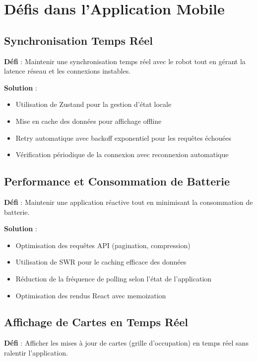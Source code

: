 \documentclass[12pt,a4paper,oneside]{report}
\begin{document}
\section{Défis dans l'Application Mobile}

\subsection{Synchronisation Temps Réel}

\textbf{Défi} : Maintenir une synchronisation temps réel avec le robot tout en gérant la latence réseau et les connexions instables.

\textbf{Solution} :
\begin{itemize}
  \item Utilisation de Zustand pour la gestion d'état locale
  \item Mise en cache des données pour affichage offline
  \item Retry automatique avec backoff exponentiel pour les requêtes échouées
  \item Vérification périodique de la connexion avec reconnexion automatique
\end{itemize}

\subsection{Performance et Consommation de Batterie}

\textbf{Défi} : Maintenir une application réactive tout en minimisant la consommation de batterie.

\textbf{Solution} :
\begin{itemize}
  \item Optimisation des requêtes API (pagination, compression)
  \item Utilisation de SWR pour le caching efficace des données
  \item Réduction de la fréquence de polling selon l'état de l'application
  \item Optimisation des rendus React avec memoization
\end{itemize}

\subsection{Affichage de Cartes en Temps Réel}

\textbf{Défi} : Afficher les mises à jour de cartes (grille d'occupation) en temps réel sans ralentir l'application.
\end{document}
